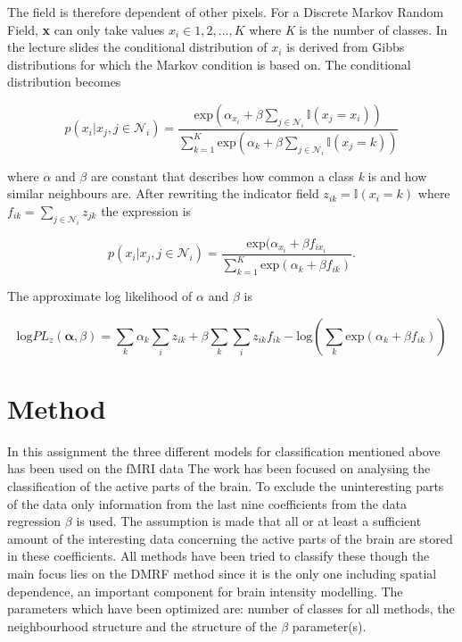 \documentclass[a4paper,english]{article}
\begin{document}
The field is therefore dependent of other pixels. For a Discrete Markov Random Field, \textbf{x} can only take values $x_i \in 1,2,...,K$ where \textit{K} is the number of classes. In the lecture slides the conditional distribution of $x_i$ is derived from Gibbs distributions for which the Markov condition is based on. The conditional distribution becomes

\begin{equation}
p(x_i|x_j,j\in \mathcal{N}_i) = \dfrac{\text{exp}(\alpha_{x_i}+\beta\sum_{j\in \mathcal{N}_i}\mathds{I}(x_j = x_i))}{\sum^K_{k=1}\text{exp}(\alpha_k + \beta\sum_{j\in \mathcal{N}_i}\mathds{I}(x_j = k))}
\end{equation}

where $\alpha$ and $\beta$ are constant that describes how common a class \textit{k} is and how similar neighbours are. After rewriting the indicator field $z_{ik} = \mathds{I}(x_i = k)$ where $f_{ik} = \sum_{j\in \mathcal{N}_i} z_{jk}$ the expression is

\begin{equation}
p(x_i|x_j,j\in \mathcal{N}_i) = \dfrac{\text{exp}(\alpha_{x_i}+\beta f_{ix_i} }{\sum^K_{k=1}\text{exp}(\alpha_k + \beta f_{ik})}.
\end{equation}

The approximate log likelihood of $\alpha$ and $\beta$ is

\begin{equation}
	\text{log} PL_z(\boldsymbol{\alpha},\beta) = \sum_k \alpha_k \sum_i z_{ik} + \beta \sum_k \sum_i z_{ik}f_{ik} - \text{log}(\sum_k \text{exp}(\alpha_k + \beta f_{ik}))
\end{equation}



\section{Method}
In this assignment the three different models for classification mentioned above has been used on the fMRI data
The work has been focused on analysing the classification of the active parts of the brain.
To exclude the uninteresting parts of the data only information from the last nine coefficients from the data regression $\beta$ is used.
The assumption is made that all or at least a sufficient amount of the interesting data concerning the active parts of the brain are stored in these coefficients.
All methods have been tried to classify these though the main focus lies on the DMRF method since it is the only one including spatial dependence, an important component for brain intensity modelling.
The parameters which have been optimized are: number of classes for all methods, the neighbourhood structure and the structure of the $\beta$ parameter(s).
\end{document}
